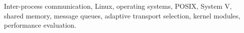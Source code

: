 \documentclass[conference]{IEEEtran}
\begin{document}
\begin{IEEEkeywords}
Inter-process communication, Linux, operating systems, POSIX, System V, shared memory, message queues, adaptive transport selection, kernel modules, performance evaluation.
\end{IEEEkeywords}













\end{document}
